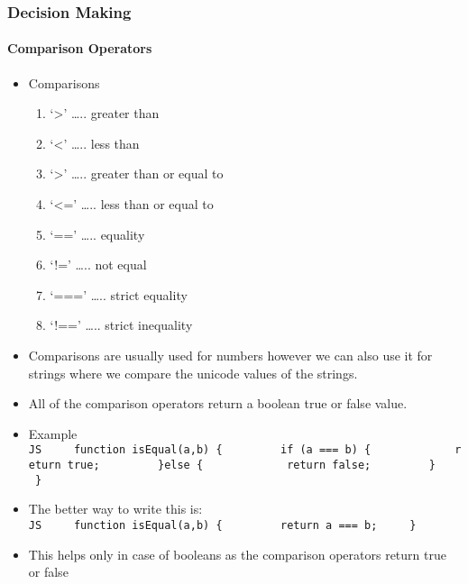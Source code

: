 \documentclass[
  paper=a4,
  ,captions=tableheading
]{scrartcl}
\providecommand{\tightlist}{%
  \setlength{\itemsep}{0pt}\setlength{\parskip}{0pt}}
\begin{document}
\hypertarget{decision-making}{%
\subsubsection{Decision Making}\label{decision-making}}

\hypertarget{comparison-operators}{%
\paragraph{Comparison Operators}\label{comparison-operators}}

\begin{itemize}
\tightlist
\item
  Comparisons

  \begin{enumerate}
  \def\labelenumi{\arabic{enumi}.}
  \tightlist
  \item
    `\textgreater{}' \ldots.. greater than
  \item
    `\textless{}' \ldots.. less than
  \item
    `\textgreater{}' \ldots.. greater than or equal to
  \item
    `\textless=' \ldots.. less than or equal to
  \item
    `==' \ldots.. equality
  \item
    `!=' \ldots.. not equal
  \item
    `===' \ldots.. strict equality
  \item
    `!==' \ldots.. strict inequality
  \end{enumerate}
\item
  Comparisons are usually used for numbers however we can also use it
  for strings where we compare the unicode values of the strings.
\item
  All of the comparison operators return a boolean true or false value.
\item
  Example
  \texttt{JS\ \ \ \ \ function\ isEqual(a,b)\ \{\ \ \ \ \ \ \ \ \ if\ (a\ ===\ b)\ \{\ \ \ \ \ \ \ \ \ \ \ \ \ return\ true;\ \ \ \ \ \ \ \ \ \}else\ \{\ \ \ \ \ \ \ \ \ \ \ \ \ return\ false;\ \ \ \ \ \ \ \ \ \}\ \ \ \ \ \}}
\item
  The better way to write this is:
  \texttt{JS\ \ \ \ \ function\ isEqual(a,b)\ \{\ \ \ \ \ \ \ \ \ return\ a\ ===\ b;\ \ \ \ \ \}}
\item
  This helps only in case of booleans as the comparison operators return
  true or false
\end{itemize}
\end{document}
